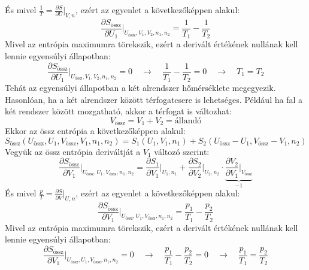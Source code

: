 \documentclass[../main.tex]{subfiles}
\begin{document}
És mivel $\frac{1}{T} = \frac{\partial S}{\partial U}\bigg|_{V,n}$, ezért az egyenlet a következőképpen alakul:
\begin{equation}
    \frac{\partial S_{\text{össz}}}{\partial U_1}\bigg|_{U_{\text{össz}}, V_1, V_2, n_1, n_2} = \frac{1}{T_1} - \frac{1}{T_2}
\end{equation}
Mivel az entrópia maximumra törekszik, ezért a derivált értékének nullának kell lennie egyensúlyi állapotban:
\begin{equation}
    \frac{\partial S_{\text{össz}}}{\partial U_1}\bigg|_{U_{\text{össz}}, V_1, V_2, n_1, n_2} = 0 \quad \to \quad \frac{1}{T_1} - \frac{1}{T_2} = 0 \quad \to \quad T_1 = T_2
\end{equation}
Tehát az egyensúlyi állapotban a két alrendszer hőmérséklete megegyezik. 
\newline
\newline
Hasonlóan, ha a két alrendszer között térfogatcsere is lehetséges. Például ha fal a két rendszer között mozgatható, akkor a térfogat is változhat:
\begin{equation}
    V_{\text{össz}} = V_1 + V_2 = \text{állandó}
\end{equation}
Ekkor az össz entrópia a következőképpen alakul:
\begin{equation}
    S_{\text{össz}} (U_{\text{össz}}, U_1, V_{\text{össz}}, V_1, n_1, n_2) = S_1(U_1, V_1, n_1) + S_2(U_{\text{össz}} - U_1, V_{\text{össz}} - V_1, n_2)
\end{equation}
Vegyük az össz entrópia deriváltját a $V_1$ változó szerint:
\begin{equation}
    \frac{\partial S_{\text{össz}}}{\partial V_1}\bigg|_{U_{\text{össz}}, U_1, V_{\text{össz}}, n_1, n_2} = \frac{\partial S_1}{\partial V_1}\bigg|_{U_1, n_1} + \frac{\partial S_2}{\partial V_2}\bigg|_{U_2, n_2} \cdot \underbrace{\frac{\partial V_2}{\partial V_1}\bigg|_{V_{\text{össz}}}}_{-1}
\end{equation}
És mivel $\frac{p}{T} = \frac{\partial S}{\partial V}\bigg|_{U,n}$, ezért az egyenlet a következőképpen alakul:
\begin{equation}
    \frac{\partial S_{\text{össz}}}{\partial V_1}\bigg|_{U_{\text{össz}}, U_1, V_{\text{össz}}, n_1, n_2} = \frac{p_1}{T_1} - \frac{p_2}{T_2}
\end{equation}
Mivel az entrópia maximumra törekszik, ezért a derivált értékének nullának kell lennie egyensúlyi állapotban:
\begin{equation}
    \frac{\partial S_{\text{össz}}}{\partial V_1}\bigg|_{U_{\text{össz}}, U_1, V_{\text{össz}}, n_1, n_2} = 0 \quad \to \quad \frac{p_1}{T_1} - \frac{p_2}{T_2} = 0 \quad \to \quad \frac{p_1}{T_1} = \frac{p_2}{T_2}
\end{equation}
\end{document}
